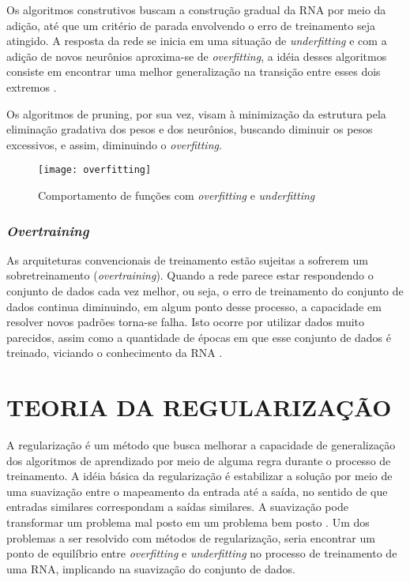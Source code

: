 Os algoritmos construtivos buscam a construção gradual da RNA por meio da adição, até que um critério de parada envolvendo o erro de treinamento seja atingido. A resposta da rede se inicia em uma situação de \textit{underfitting} e com a adição de novos neurônios aproxima-se de \textit{overfitting}, a idéia desses algoritmos consiste em encontrar uma melhor generalização na transição entre esses dois extremos \cite{medeiros}.

Os algoritmos de pruning, por sua vez, visam à minimização da estrutura pela eliminação gradativa dos pesos e dos neurônios, buscando diminuir os pesos excessivos, e assim, diminuindo o \textit{overfitting}.

\begin{figure}[h]
	\centering
	\texttt{[image: overfitting]}
	\caption{Comportamento de funções com \textit{overfitting} e \textit{underfitting}}
	\label{overfittin-fig}
\end{figure}

\subsubsection{\textit{Overtraining}}
As arquiteturas convencionais de treinamento estão sujeitas a sofrerem um sobretreinamento (\textit{overtraining}). Quando a rede parece estar respondendo o conjunto de dados cada vez melhor, ou seja, o erro de treinamento do conjunto de dados continua diminuindo, em algum ponto desse processo, a capacidade em resolver novos padrões torna-se falha. Isto ocorre por utilizar dados muito parecidos, assim como a quantidade de épocas em que esse conjunto de dados é treinado, viciando o conhecimento da RNA \cite{haykin2000}.

\section{TEORIA DA REGULARIZAÇÃO}\label{regularizacao}
A regularização é um método que busca melhorar a capacidade de generalização dos algoritmos de aprendizado por meio de alguma regra durante o processo de treinamento. A idéia básica da regularização é estabilizar a solução por meio de uma suavização entre o mapeamento da entrada até a saída, no sentido de que entradas similares correspondam a saídas similares. A suavização pode transformar um problema mal posto em um problema bem posto \cite{medeiros}. Um dos problemas a ser resolvido com métodos de regularização, seria encontrar um ponto de equilíbrio entre \textit{overfitting} e \textit{underfitting} no processo de treinamento de uma RNA, implicando na suavização do conjunto de dados.

